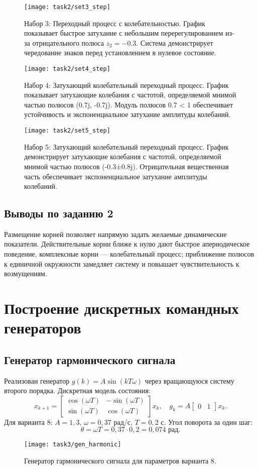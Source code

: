 \begin{figure}[H]
  \centering
  \texttt{[image: task2/set3\_step]}
  \caption{Набор 3: Переходный процесс с колебательностью. График показывает быстрое затухание с небольшим перерегулированием из-за отрицательного полюса $z_2 = -0.3$. Система демонстрирует чередование знаков перед установлением в нулевое состояние.}
  \label{fig:task2_set3}
\end{figure}

\begin{figure}[H]
  \centering
  \texttt{[image: task2/set4\_step]}
  \caption{Набор 4: Затухающий колебательный переходный процесс. График показывает затухающие колебания с частотой, определяемой мнимой частью полюсов (0.7j, -0.7j). Модуль полюсов 0.7 < 1 обеспечивает устойчивость и экспоненциальное затухание амплитуды колебаний.}
  \label{fig:task2_set4}
\end{figure}

\begin{figure}[H]
  \centering
  \texttt{[image: task2/set5\_step]}
  \caption{Набор 5: Затухающий колебательный переходный процесс. График демонстрирует затухающие колебания с частотой, определяемой мнимой частью полюсов (-0.3±0.8j). Отрицательная вещественная часть обеспечивает экспоненциальное затухание амплитуды колебаний.}
  \label{fig:task2_set5}
\end{figure}

\section*{Выводы по заданию 2}
Размещение корней позволяет напрямую задать желаемые динамические показатели. Действительные корни ближе к нулю дают быстрое апериодическое поведение, комплексные корни — колебательный процесс; приближение полюсов к единичной окружности замедляет систему и повышает чувствительность к возмущениям.

\chapter{Построение дискретных командных генераторов}
\section{Генератор гармонического сигнала}
Реализован генератор \(g(k) = A\sin(kT\omega)\) через вращающуюся систему второго порядка. Дискретная модель состояния:
\[
  x_{k+1} = \begin{bmatrix} \cos(\omega T) & -\sin(\omega T) \\ \sin(\omega T) & \cos(\omega T) \end{bmatrix} x_k, \quad g_k = A \begin{bmatrix} 0 & 1 \end{bmatrix} x_k.
\]
Для варианта 8: \(A = 1{,}3\), \(\omega = 0{,}37\) рад/с, \(T = 0{,}2\) с. Угол поворота за один шаг:
\[
  \theta = \omega T = 0{,}37 \cdot 0{,}2 = 0{,}074 \text{ рад}.
\]
\begin{figure}[H]
  \centering
  \texttt{[image: task3/gen\_harmonic]}
  \caption{Генератор гармонического сигнала для параметров варианта 8.}
\end{figure}


